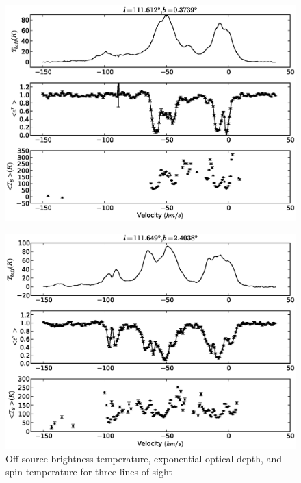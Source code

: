 \documentclass{article}
\begin{document}
\begin{figure}
	\includegraphics[scale=0.65]{111.612_0.3739.eps}
\end{figure}
\begin{figure}
	\includegraphics[scale=0.65]{111.649_2.4038.eps}
\caption{Off-source brightness temperature, exponential optical depth, and 
spin temperature for three lines of sight}
\end{figure}
\end{document}
